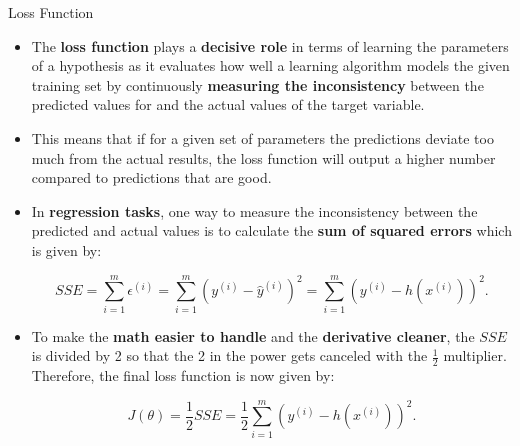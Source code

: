 \documentclass[main.tex]{subfiles}
\begin{document}
    \begin{frame}{Loss Function}
        \begin{itemize}
            \item The \textbf{loss function} plays a \textbf{decisive role} in terms of learning the parameters of a hypothesis as it evaluates how well a learning algorithm models the given training set by continuously \textbf{measuring the inconsistency} between the predicted values for and the actual values of the target variable.
            \item This means that if for a given set of parameters the predictions deviate too much from the actual results, the loss function will output a higher number compared to predictions that are good.
            \item In \textbf{regression tasks}, one way to measure the inconsistency between the predicted and actual values is to calculate the \textbf{sum of squared errors} which is given by:
            
            $$SSE = \sum_{i=1}^m \epsilon^{(i)} = \sum_{i=1}^m (y^{(i)} - \hat y^{(i)})^2 = \sum_{i=1}^m (y^{(i)} - h(x^{(i)}))^2.$$
            
            \item To make the \textbf{math easier to handle} and the \textbf{derivative cleaner}, the $SSE$ is divided by 2 so that the 2 in the power gets canceled with the $\frac{1}{2}$ multiplier. Therefore, the final loss function is now given by:
            
            $$J(\theta) = \frac{1}{2} SSE = \frac{1}{2} \sum_{i=1}^m (y^{(i)} - h(x^{(i)}))^2.$$
        \end{itemize}
    \end{frame}
\end{document}
